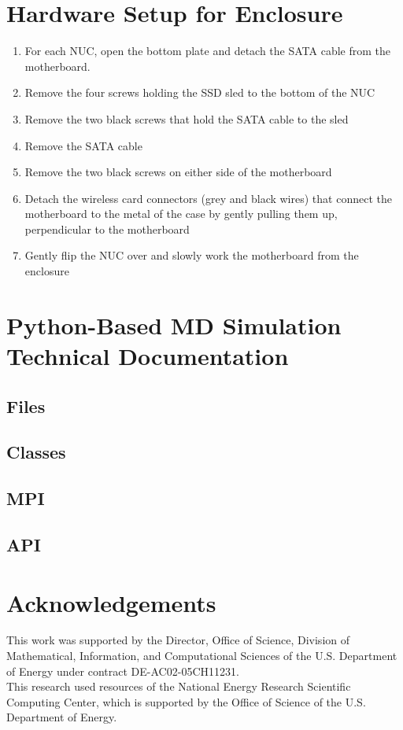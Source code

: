 \documentclass{article}
\begin{document}
\section{Hardware Setup for Enclosure}
\begin{enumerate}
    \item For each NUC, open the bottom plate and detach the SATA cable from the
        motherboard.
    \item Remove the four screws holding the SSD sled to the bottom of the NUC
    \item Remove the two black screws that hold the SATA cable to the sled
    \item Remove the SATA cable
    \item Remove the two black screws on either side of the motherboard
    \item Detach the wireless card connectors (grey and black wires) that
        connect the motherboard to the metal of the case by gently pulling them
        up, perpendicular to the motherboard
    \item Gently flip the NUC over and slowly work the motherboard from the
        enclosure
\end{enumerate}

\section{Python-Based MD Simulation Technical Documentation}
\subsection{Files}
\subsection{Classes}
\subsection{MPI}
\subsection{API}

\section{Acknowledgements}
This work was supported by the Director, Office of Science, Division of
Mathematical, Information, and Computational Sciences of the U.S. Department of
Energy under contract DE-AC02-05CH11231.\\

This research used resources of the National Energy Research Scientific
Computing Center, which is supported by the Office of Science of the U.S.
Department of Energy.
\end{document}
